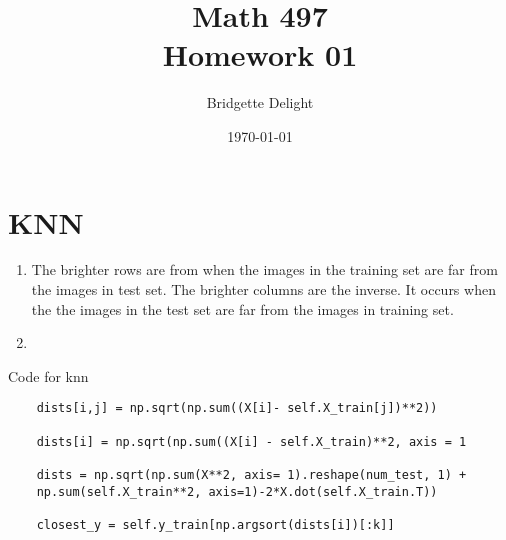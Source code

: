\documentclass{article}
\title{{\large Math 497}\\ Homework 01}
\author{Bridgette Delight}
\date{\today}
\begin{document}
\maketitle

\section{KNN}

\begin{enumerate}
    \item The brighter rows are from when the images in the training set are far from the images in test set. The brighter columns are the inverse. It occurs when the  the images in the test set are far from the images in training set.
    \item 
\end{enumerate}


Code for knn
\begin{verbatim}
    dists[i,j] = np.sqrt(np.sum((X[i]- self.X_train[j])**2))
    
    dists[i] = np.sqrt(np.sum((X[i] - self.X_train)**2, axis = 1
    
    dists = np.sqrt(np.sum(X**2, axis= 1).reshape(num_test, 1) + 
    np.sum(self.X_train**2, axis=1)-2*X.dot(self.X_train.T))
    
    closest_y = self.y_train[np.argsort(dists[i])[:k]]
\end{verbatim}


\section{}
\vspace{10mm}


\section{}
\vspace{10mm}


\section{}
\vspace{10mm}

\section{}
\vspace{10mm}

\section{}
\vspace{10mm}
\end{document}
